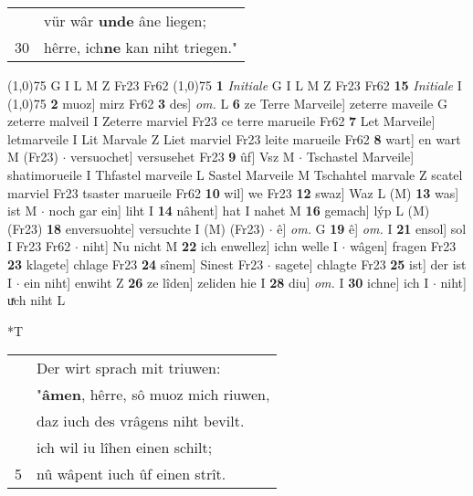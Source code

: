 \documentclass[8pt,a4paper,notitlepage]{article}
\begin{document}
\begin{table}[ht]
\begin{minipage}[t]{0.5\linewidth}
\begin{tabular}{rl}
 & vür wâr \textbf{unde} âne liegen;\\ 
30 & hêrre, ich\textbf{ne} kan niht triegen."\\ 
\end{tabular}
\scriptsize
\line(1,0){75} \newline
G I L M Z Fr23 Fr62 \newline
\line(1,0){75} \newline
\textbf{1} \textit{Initiale} G I L M Z Fr23 Fr62  \textbf{15} \textit{Initiale} I  \newline
\line(1,0){75} \newline
\textbf{2} muoz] mirz Fr62 \textbf{3} des] \textit{om.} L \textbf{6} ze Terre Marveile] zeterre maveile G zeterre malveil I Zeterre marviel Fr23 ce terre marueile Fr62 \textbf{7} Let Marveile] letmarveile I Lit Marvale Z Liet marviel Fr23 leite marueile Fr62 \textbf{8} wart] en wart M (Fr23)  $\cdot$ versuochet] versusehet Fr23 \textbf{9} ûf] Vsz M  $\cdot$ Tschastel Marveile] shatimorueile I Thfastel marveile L Sastel Marveile M Tschahtel marvale Z scatel marviel Fr23 tsaster marueile Fr62 \textbf{10} wil] we Fr23 \textbf{12} swaz] Waz L (M) \textbf{13} was] ist M  $\cdot$ noch gar ein] liht I \textbf{14} nâhent] hat I nahet M \textbf{16} gemach] lýp L (M) (Fr23) \textbf{18} enversuohte] versuchte I (M) (Fr23)  $\cdot$ ê] \textit{om.} G \textbf{19} ê] \textit{om.} I \textbf{21} ensol] sol I Fr23 Fr62  $\cdot$ niht] Nu nicht M \textbf{22} ich enwellez] ichn welle I  $\cdot$ wâgen] fragen Fr23 \textbf{23} klagete] chlage Fr23 \textbf{24} sînem] Sinest Fr23  $\cdot$ sagete] chlagte Fr23 \textbf{25} ist] der ist I  $\cdot$ ein niht] enwiht Z \textbf{26} ze lîden] zeliden hie I \textbf{28} diu] \textit{om.} I \textbf{30} ichne] ich I  $\cdot$ niht] uͯch niht L \newline
\end{minipage}
\hspace{0.5cm}
\begin{minipage}[t]{0.5\linewidth}
\small
\begin{center}*T
\end{center}
\begin{tabular}{rl}
 & Der wirt sprach mit triuwen:\\ 
 & "\textbf{âmen}, hêrre, sô muoz mich riuwen,\\ 
 & daz iuch des vrâgens niht bevilt.\\ 
 & ich wil iu lîhen einen schilt;\\ 
5 & nû wâpent iuch ûf einen strît.\\ 

\end{tabular}
\end{minipage}
\end{table}
\end{document}

